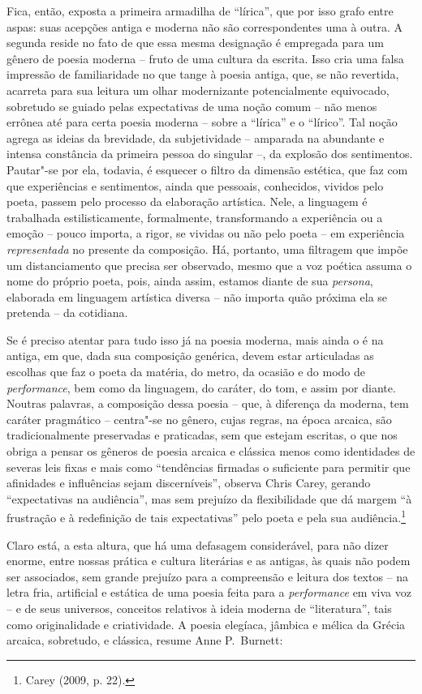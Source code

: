 Fica, então, exposta a primeira armadilha de “lírica”, que por isso grafo
entre aspas: suas acepções antiga e moderna não são correspondentes uma
à outra. A segunda reside no fato de que essa mesma designação é empregada para
um gênero de
poesia moderna -- fruto de uma cultura da escrita. Isso cria uma falsa impressão
de familiaridade no que tange à poesia antiga, que, se não revertida, acarreta
para sua leitura um olhar modernizante potencialmente equivocado, sobretudo se
guiado pelas expectativas de uma noção comum -- não menos errônea até para certa
poesia moderna -- sobre a “lírica” e o “lírico”. Tal noção agrega as ideias da
brevidade, da subjetividade -- amparada na abundante e intensa constância da
primeira pessoa do singular --, da explosão dos sentimentos. Pautar"-se por
ela, todavia, é esquecer o filtro da dimensão estética, que faz com que
experiências e sentimentos, ainda que pessoais, conhecidos, vividos pelo poeta,
passem pelo processo da elaboração artística. Nele, a linguagem é trabalhada
estilisticamente, formalmente, transformando a experiência ou a emoção -- pouco
importa, a rigor, se vividas ou não pelo poeta -- em experiência
\textit{representada} no presente da composição. Há, portanto, uma filtragem
que impõe um distanciamento que precisa ser observado, mesmo que a voz poética
assuma o nome do próprio poeta, pois, ainda assim, estamos diante de sua
\textit{persona}, elaborada em linguagem artística diversa -- não importa
quão próxima ela se pretenda -- da cotidiana.

Se é preciso atentar para tudo isso já na poesia moderna, mais ainda o é na antiga, em que, dada sua composição genérica, devem
estar articuladas as escolhas que faz o poeta da matéria, do metro, da ocasião
e do modo de \textit{performance}, bem como da linguagem, do caráter, do tom, e
assim por diante. Noutras palavras, a composição dessa poesia -- que, à diferença
da moderna, tem caráter pragmático -- centra"-se no gênero, cujas regras,
na época arcaica, são tradicionalmente preservadas e praticadas, sem que
estejam escritas, o que nos obriga a pensar os gêneros de poesia arcaica e
clássica menos como identidades de severas leis fixas e mais como
“tendências firmadas o suficiente para permitir que afinidades e influências
sejam discerníveis”, observa Chris Carey, gerando
“expectativas na audiência”, mas sem prejuízo da flexibilidade que dá margem “à
frustração e à redefinição de tais expectativas” pelo poeta e pela sua
audiência.\footnote{ Carey (2009, p. 22).}

Claro está, a esta altura, que há uma defasagem considerável, para não dizer
enorme, entre nossas prática e cultura literárias e as antigas, às quais não
podem ser associados, sem grande prejuízo para a compreensão e leitura dos
textos -- na letra fria, artificial e estática de uma poesia feita para a
\textit{performance} em viva voz -- e de seus universos, conceitos relativos à
ideia moderna de “literatura”, tais como originalidade e criatividade. A poesia
elegíaca, jâmbica e mélica da Grécia arcaica, sobretudo, e clássica, resume
Anne P.~Burnett: 

